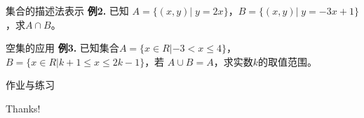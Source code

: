 \documentclass[10pt,
	aspectratio=169,%
	hyperref={colorlinks,
		citecolor=peking_blue,
		urlcolor=peking_blue,
		linkcolor=},
	t,%
	]{beamer}
\theoremstyle{plain}
\begin{document}
\begin{frame}[t]{集合的描述法表示}
	\textbf{例2.} 已知 $A = \{ (x,y) | \;y = 2x\}$，$B = \{ (x,y) | \;y = -3x + 1\}$，求$A \cap B$。
\end{frame}

\begin{frame}[t]{空集的应用}%
	\textbf{例3.} 已知集合$A = \{ x \in R | -3 < x \leq 4\}$，$B = \{ x \in R | k + 1 \leq x \leq 2k-1\}$，若 $A \cup B = A$，求实数$k$的取值范围。
	
	\vfill\textsf{}
	
	\null
%    
%    
\end{frame}

\begin{frame}{作业与练习}
	
\end{frame}

\begin{frame}[c]
    \begin{center}
        {\Huge\calligra Thanks!}
    \end{center}
\end{frame}
\end{document}
